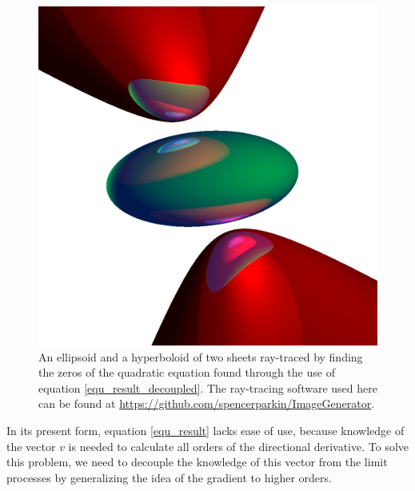\documentclass{birkjour}
\theoremstyle{definition}
\theoremstyle{remark}
\numberwithin{equation}{section}
\begin{document}
\begin{figure}
\includegraphics[scale=0.3]{Quadrics}
\caption{An ellipsoid and a hyperboloid of two sheets ray-traced by finding the zeros
of the quadratic equation found through the use of equation \eqref{equ_result_decoupled}.
The ray-tracing software used here can be found at \url{https://github.com/spencerparkin/ImageGenerator}.}
\label{fig_ray_traced_image}
\end{figure}

In its present form, equation \eqref{equ_result} lacks ease of use, because knowledge of the
vector $v$ is needed to calculate all orders of the directional derivative.  To solve this problem,
we need to decouple the knowledge of this vector from the limit processes by generalizing the
idea of the gradient to higher orders.
\end{document}
